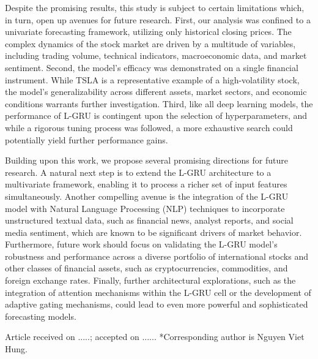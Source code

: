 \documentclass{cys}
\begin{document}
Despite the promising results, this study is subject to certain limitations which, in turn, open up avenues for future research. First, our analysis was confined to a univariate forecasting framework, utilizing only historical closing prices. The complex dynamics of the stock market are driven by a multitude of variables, including trading volume, technical indicators, macroeconomic data, and market sentiment. Second, the model's efficacy was demonstrated on a single financial instrument. While TSLA is a representative example of a high-volatility stock, the model's generalizability across different assets, market sectors, and economic conditions warrants further investigation. Third, like all deep learning models, the performance of L-GRU is contingent upon the selection of hyperparameters, and while a rigorous tuning process was followed, a more exhaustive search could potentially yield further performance gains.

Building upon this work, we propose several promising directions for future research. A natural next step is to extend the L-GRU architecture to a multivariate framework, enabling it to process a richer set of input features simultaneously. Another compelling avenue is the integration of the L-GRU model with Natural Language Processing (NLP) techniques to incorporate unstructured textual data, such as financial news, analyst reports, and social media sentiment, which are known to be significant drivers of market behavior. Furthermore, future work should focus on validating the L-GRU model's robustness and performance across a diverse portfolio of international stocks and other classes of financial assets, such as cryptocurrencies, commodities, and foreign exchange rates. Finally, further architectural explorations, such as the integration of attention mechanisms within the L-GRU cell or the development of adaptive gating mechanisms, could lead to even more powerful and sophisticated forecasting models.



\vspace{12pt}


Article received on .....; accepted on ...... 
*Corresponding author is Nguyen Viet Hung. 
\end{document}
